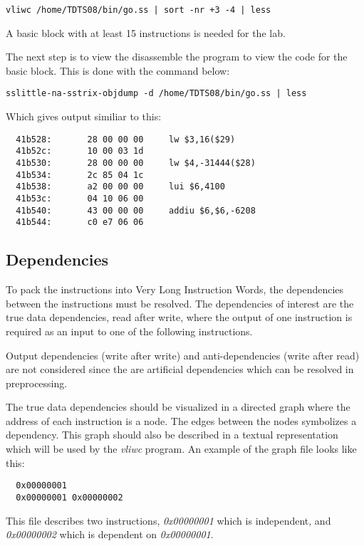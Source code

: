 \documentclass[titlepage, a4paper]{article}
\begin{document}
\begin{lstlisting}
vliwc /home/TDTS08/bin/go.ss | sort -nr +3 -4 | less
\end{lstlisting}

A basic block with at least 15 instructions is needed for the lab.

The next step is to view the disassemble the program to view the code for the basic block. This is done with the command below:

\begin{lstlisting}
sslittle-na-sstrix-objdump -d /home/TDTS08/bin/go.ss | less
\end{lstlisting}

Which gives output similiar to this:

\begin{lstlisting}
  41b528:       28 00 00 00     lw $3,16($29)
  41b52c:       10 00 03 1d 
  41b530:       28 00 00 00     lw $4,-31444($28)
  41b534:       2c 85 04 1c 
  41b538:       a2 00 00 00     lui $6,4100
  41b53c:       04 10 06 00 
  41b540:       43 00 00 00     addiu $6,$6,-6208
  41b544:       c0 e7 06 06 
\end{lstlisting}

\subsection{Dependencies}\label{sec:dep}
To pack the instructions into Very Long Instruction Words, the dependencies between the instructions must be resolved. The dependencies of interest are the true data dependencies, read after write, where the output of one instruction is required as an input to one of the following instructions.

Output dependencies (write after write) and anti-dependencies (write after read) are not considered since the are artificial dependencies which can be resolved in preprocessing.

The true data dependencies should be visualized in a directed graph where the address of each instruction is a node. The edges between the nodes symbolizes a dependency. This graph should also be described in a textual representation which will be used by the \textit{vliwc} program. An example of the graph file looks like this:

\begin{lstlisting}
  0x00000001
  0x00000001 0x00000002
\end{lstlisting}

This file describes two instructions, \textit{0x00000001} which is independent, and \textit{0x00000002} which is dependent on \textit{0x00000001}.
\end{document}
